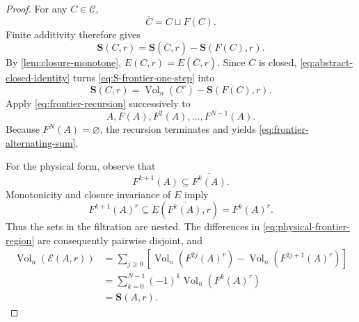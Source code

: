 \documentclass[11pt]{article}
\newcommand{\Vol}{\operatorname{Vol}}
\newcommand{\Steiner}{\mathbf S}
\newcommand{\calE}{\mathcal E}
\numberwithin{equation}{section}
\begin{document}
\begin{proof}
For any $C\in\mathcal C$,
\[
\overline C=C\sqcup F(C).
\]
Finite additivity therefore gives
\begin{equation}\label{eq:S-frontier-one-step}
\Steiner(C,r)
=
\Steiner(\overline C,r)-\Steiner(F(C),r).
\end{equation}
By \cref{lem:closure-monotone}, $E(C,r)=E(\overline C,r)$. Since $\overline C$ is closed, \eqref{eq:abstract-closed-identity} turns \eqref{eq:S-frontier-one-step} into
\begin{equation}\label{eq:frontier-recursion}
\Steiner(C,r)
=
\Vol_n(C^r)-\Steiner(F(C),r).
\end{equation}
Apply \eqref{eq:frontier-recursion} successively to
\[
A,F(A),F^2(A),\ldots,F^{N-1}(A).
\]
Because $F^N(A)=\varnothing$, the recursion terminates and yields \eqref{eq:frontier-alternating-sum}.

For the physical form, observe that
\[
F^{k+1}(A)\subseteq\overline{F^k(A)}.
\]
Monotonicity and closure invariance of $E$ imply
\[
F^{k+1}(A)^r
\subseteq
E(\overline{F^k(A)},r)
=F^k(A)^r.
\]
Thus the sets in the filtration are nested. The differences in \eqref{eq:physical-frontier-region} are consequently pairwise disjoint, and
\[
\begin{aligned}
\Vol_n(\calE(A,r))
&=\sum_{j\ge0}
\left[
\Vol_n(F^{2j}(A)^r)
-
\Vol_n(F^{2j+1}(A)^r)
\right]\\
&=\sum_{k=0}^{N-1}(-1)^k\Vol_n(F^k(A)^r)\\
&=\Steiner(A,r).
\end{aligned}
\]
\end{proof}
\end{document}
